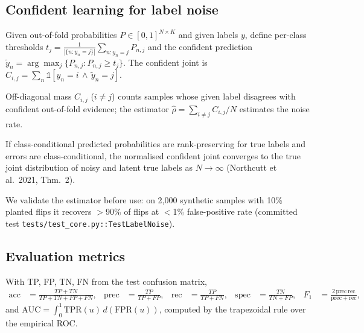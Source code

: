 \subsection{Confident learning for label noise}
\begin{definition}\label{def:cj}
Given out-of-fold probabilities $P \in [0,1]^{N \times K}$ and given labels
$y$, define per-class thresholds $t_j = \frac{1}{|\{n: y_n=j\}|}\sum_{n: y_n=j} P_{n,j}$
and the confident prediction $\tilde y_n = \arg\max_j \{P_{n,j} : P_{n,j} \ge t_j\}$.
The confident joint is $C_{i,j} = \sum_n \mathbb 1[y_n = i \,\wedge\, \tilde y_n = j]$.
\end{definition}
Off-diagonal mass $C_{i,j}$ ($i\neq j$) counts samples whose given label
disagrees with confident out-of-fold evidence; the estimator
$\hat\rho = \sum_{i\neq j} C_{i,j} / N$ estimates the noise rate.
\begin{proposition}
If class-conditional predicted probabilities are rank-preserving for true
labels and errors are class-conditional, the normalised confident joint
converges to the true joint distribution of noisy and latent true labels as
$N \to \infty$ (Northcutt et al.\ 2021, Thm.\ 2).
\end{proposition}
We validate the estimator before use: on 2{,}000 synthetic samples with 10\%
planted flips it recovers $>$90\% of flips at $<$1\% false-positive rate
(committed test \texttt{tests/test\_core.py::TestLabelNoise}).

\subsection{Evaluation metrics}
With TP, FP, TN, FN from the test confusion matrix,
\begin{align}
\mathrm{acc} &= \tfrac{TP+TN}{TP+TN+FP+FN}, &
\mathrm{prec} &= \tfrac{TP}{TP+FP}, &
\mathrm{rec} &= \tfrac{TP}{TP+FN}, &
\mathrm{spec} &= \tfrac{TN}{TN+FP}, &
F_1 &= \tfrac{2\,\mathrm{prec}\,\mathrm{rec}}{\mathrm{prec}+\mathrm{rec}},
\end{align}
and $\mathrm{AUC} = \int_0^1 \mathrm{TPR}(u)\, d(\mathrm{FPR}(u))$, computed
by the trapezoidal rule over the empirical ROC.


